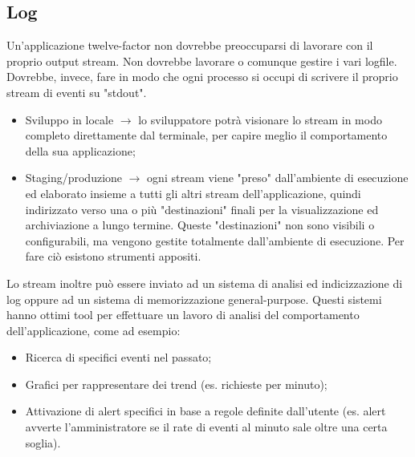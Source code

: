 \documentclass[PianoDiQualifica.tex]{subfiles}
\begin{document}
\subsection{Log}
Un'applicazione twelve-factor non dovrebbe preoccuparsi di lavorare con il proprio output stream. Non dovrebbe lavorare o comunque gestire i vari logfile. Dovrebbe, invece, fare in modo che ogni processo si occupi di scrivere il proprio stream di eventi su "stdout". 
\begin{itemize}
\item Sviluppo in locale $\rightarrow$ lo sviluppatore potrà visionare lo stream in modo completo direttamente dal terminale, per capire meglio il comportamento della sua applicazione;
\item Staging/produzione $\rightarrow$ ogni stream viene "preso" dall'ambiente di esecuzione ed elaborato insieme a tutti gli altri stream dell'applicazione, quindi indirizzato verso una o più "destinazioni" finali per la visualizzazione ed archiviazione a lungo termine. Queste "destinazioni" non sono visibili o configurabili, ma vengono gestite totalmente dall'ambiente di esecuzione. Per fare ciò esistono strumenti appositi.
\end{itemize}
Lo stream inoltre può essere inviato ad un sistema di analisi ed indicizzazione di log oppure ad un sistema di memorizzazione general-purpose. Questi sistemi hanno ottimi tool per effettuare un lavoro di analisi del comportamento dell'applicazione, come ad esempio:
\begin{itemize}
\item Ricerca di specifici eventi nel passato;
\item Grafici per rappresentare dei trend (es. richieste per minuto);
\item Attivazione di alert specifici in base a regole definite dall'utente (es. alert avverte l'amministratore se il rate di eventi al minuto sale oltre una certa soglia).
\end{itemize}
\end{document}
